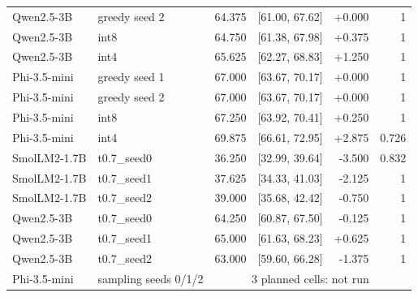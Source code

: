 \begin{table}[tbp]
\begin{tabular}{llrrrr}
Qwen2.5-3B & greedy seed 2 & 64.375 & [61.00, 67.62] & +0.000 & 1 \\
Qwen2.5-3B & int8 & 64.750 & [61.38, 67.98] & +0.375 & 1 \\
Qwen2.5-3B & int4 & 65.625 & [62.27, 68.83] & +1.250 & 1 \\
Phi-3.5-mini & greedy seed 1 & 67.000 & [63.67, 70.17] & +0.000 & 1 \\
Phi-3.5-mini & greedy seed 2 & 67.000 & [63.67, 70.17] & +0.000 & 1 \\
Phi-3.5-mini & int8 & 67.250 & [63.92, 70.41] & +0.250 & 1 \\
Phi-3.5-mini & int4 & 69.875 & [66.61, 72.95] & +2.875 & 0.726 \\
SmolLM2-1.7B & t0.7\_seed0 & 36.250 & [32.99, 39.64] & -3.500 & 0.832 \\
SmolLM2-1.7B & t0.7\_seed1 & 37.625 & [34.33, 41.03] & -2.125 & 1 \\
SmolLM2-1.7B & t0.7\_seed2 & 39.000 & [35.68, 42.42] & -0.750 & 1 \\
Qwen2.5-3B & t0.7\_seed0 & 64.250 & [60.87, 67.50] & -0.125 & 1 \\
Qwen2.5-3B & t0.7\_seed1 & 65.000 & [61.63, 68.23] & +0.625 & 1 \\
Qwen2.5-3B & t0.7\_seed2 & 63.000 & [59.60, 66.28] & -1.375 & 1 \\
Phi-3.5-mini & sampling seeds 0/1/2 & \multicolumn{4}{c}{3 planned cells: not run} \\
\bottomrule\end{tabular}
\end{table}
